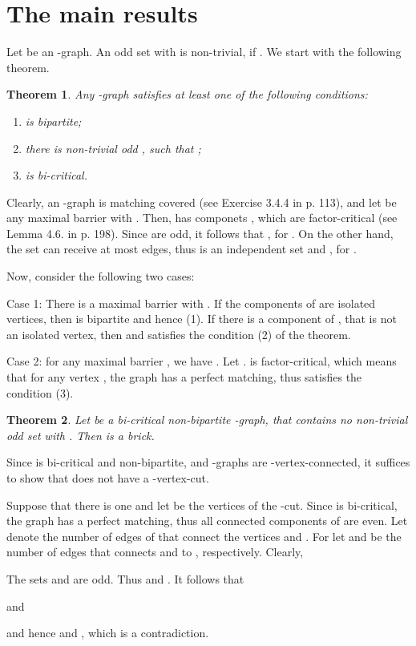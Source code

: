 \documentclass[fleqn,12pt]{article}
\newtheorem{theorem}{Theorem}
\newenvironment{proof}[1][Proof.]{\begin{trivlist}
\item[\hskip \labelsep {\bfseries #1}]}{\end{trivlist}}
\begin{document}
\section{The main results}

Let  be an -graph. An odd set  with  is non-trivial, if .
We start with the following theorem. 

\begin{theorem}\label{decomposition}Any -graph  satisfies at least one of the following conditions:
\begin{enumerate}
	\item [(1)]  is bipartite;
	\item [(2)] there is non-trivial odd , such that ;
	\item [(3)]  is bi-critical.
\end{enumerate}
\end{theorem}

\begin{proof} Clearly, an -graph is matching covered (see Exercise 3.4.4 in \cite{Lov} p. 113), and let
 be any maximal barrier with . Then,  has  componets , which are factor-critical (see Lemma 4.6. in \cite{Handbook} p. 198). 
Since  are odd, it follows that , for . On the other hand, the set  can receive at most  edges, 
thus  is an independent set and , for . 

Now, consider the following two cases:

Case 1: There is a maximal barrier  with . 
If the components of  are isolated vertices, then  is bipartite and hence (1). If there is a component  of , 
that is not an isolated vertex, then  and  satisfies the condition (2) of the theorem.

Case 2: for any maximal barrier , we have .
Let .  is factor-critical, which means that for any vertex , the graph  has a perfect matching, thus  satisfies the condition (3).

\end{proof}



\begin{theorem}\label{BrickTheorem} Let  be a bi-critical non-bipartite -graph, that contains no non-trivial odd set  with . Then  is a brick.
\end{theorem}

\begin{proof} Since  is bi-critical and non-bipartite, and -graphs are -vertex-connected, it suffices to show that  does not have a -vertex-cut. 

Suppose that there is one and let  be the vertices of the -cut. Since  is bi-critical, the graph  has a perfect matching, thus all connected 
components  of  are even. Let  denote the number of edges of  that connect the vertices  and . For  let  and  
be the number of edges that connects  and  to , respectively. Clearly,


The sets  and  are odd. Thus  and . It follows that

and

and hence
 and , which is a contradiction.

\end{proof}
\end{document}
